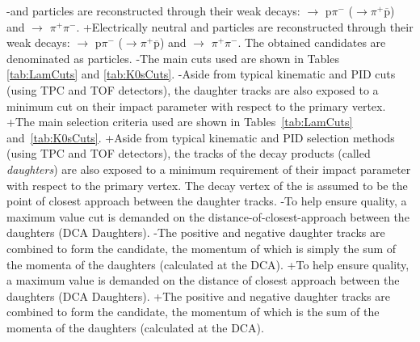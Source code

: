 -\LamALam and \Ks particles are reconstructed through their weak decays: \Lam $\rightarrow$ p$\pi^{-}$ (\ALam $\rightarrow \pi^{+}\overline{\mathrm{p}}$) and \Ks $\rightarrow$ $\pi^{+}\pi^{-}$.
+Electrically neutral \LamALam and \Ks particles are reconstructed through their weak decays: \Lam $\rightarrow$ p$\pi^{-}$ (\ALam $\rightarrow \pi^{+}\overline{\mathrm{p}}$) and \Ks $\rightarrow$ $\pi^{+}\pi^{-}$.
 The obtained candidates are denominated as \Vz particles.
-The main cuts used are shown in Tables \ref{tab:LamCuts} and \ref{tab:K0sCuts}.
-Aside from typical kinematic and PID cuts (using TPC and TOF detectors), the daughter tracks are also exposed to a minimum cut on their impact parameter with respect to the primary vertex.  
+The main selection criteria used are shown in Tables~\ref{tab:LamCuts} and~\ref{tab:K0sCuts}.
+Aside from typical kinematic and PID selection methods (using TPC and TOF detectors), the tracks of the decay products (called \textit{daughters}) are also exposed to a minimum requirement of their impact parameter with respect to the primary vertex.  
 The decay vertex of the \Vz is assumed to be the point of closest approach between the daughter tracks.
-To help ensure quality, a maximum value cut is demanded on the distance-of-closest-approach between the daughters (DCA \Vz Daughters).
-The positive and negative daughter tracks are combined to form the \Vz candidate, the momentum of which is simply the sum of the momenta of the daughters (calculated at the DCA).
+To help ensure quality, a maximum value is demanded on the distance of closest approach between the daughters (DCA \Vz Daughters).
+The positive and negative daughter tracks are combined to form the \Vz candidate, the momentum of which is the sum of the momenta of the daughters (calculated at the DCA).
 

